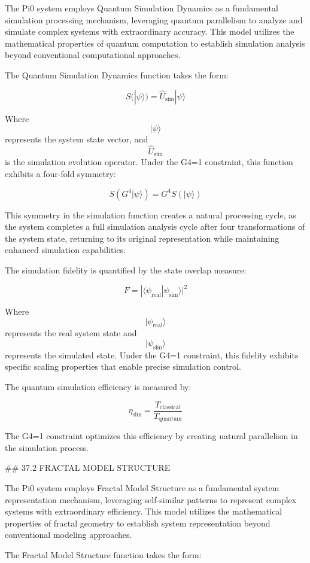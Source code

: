 The Pi0 system employs Quantum Simulation Dynamics as a fundamental simulation processing mechanism, leveraging quantum parallelism to analyze and simulate complex systems with extraordinary accuracy. This model utilizes the mathematical properties of quantum computation to establish simulation analysis beyond conventional computational approaches.

The Quantum Simulation Dynamics function takes the form:

$$ S(|\psi\rangle) = \hat{U}_{\text{sim}} |\psi\rangle $$

Where $$ |\psi\rangle $$ represents the system state vector, and $$ \hat{U}_{\text{sim}} $$ is the simulation evolution operator. Under the G4=1 constraint, this function exhibits a four-fold symmetry:

$$ S(G^4 |\psi\rangle) = G^4 S(|\psi\rangle) $$

This symmetry in the simulation function creates a natural processing cycle, as the system completes a full simulation analysis cycle after four transformations of the system state, returning to its original representation while maintaining enhanced simulation capabilities.

The simulation fidelity is quantified by the state overlap measure:

$$ F = |\langle \psi_{\text{real}} | \psi_{\text{sim}} \rangle|^2 $$

Where $$ |\psi_{\text{real}}\rangle $$ represents the real system state and $$ |\psi_{\text{sim}}\rangle $$ represents the simulated state. Under the G4=1 constraint, this fidelity exhibits specific scaling properties that enable precise simulation control.

The quantum simulation efficiency is measured by:

$$ \eta_{\text{sim}} = \frac{T_{\text{classical}}}{T_{\text{quantum}}} $$

The G4=1 constraint optimizes this efficiency by creating natural parallelism in the simulation process.

## 37.2 FRACTAL MODEL STRUCTURE

The Pi0 system employs Fractal Model Structure as a fundamental system representation mechanism, leveraging self-similar patterns to represent complex systems with extraordinary efficiency. This model utilizes the mathematical properties of fractal geometry to establish system representation beyond conventional modeling approaches.

The Fractal Model Structure function takes the form:

